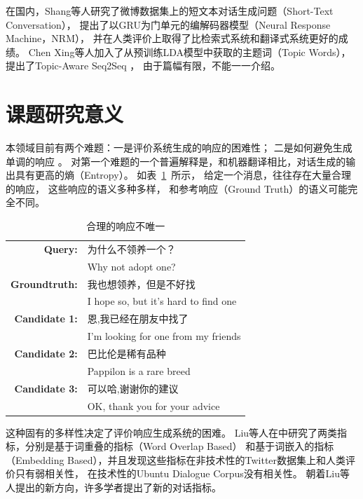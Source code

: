 在国内，Shang等人研究了微博数据集上的短文本对话生成问题（Short-Text Conversation），
提出了以GRU为门单元的编解码器模型（Neural Response Machine，NRM），
并在人类评价上取得了比检索式系统和翻译式系统更好的成绩。
Chen Xing等人加入了从预训练LDA模型中获取的主题词（Topic Words），提出了Topic-Aware Seq2Seq ，
由于篇幅有限，不能一一介绍。


\section{课题研究意义}\label{sec:research_meaning}
本领域目前有两个难题：一是评价系统生成的响应的困难性；
二是如何避免生成单调的响应
。
对第一个难题的一个普遍解释是，和机器翻译相比，对话生成的输出具有更高的熵（Entropy）。
如表~\ref{tab:multiple_valid_responses}~所示，
给定一个消息，往往存在大量合理的响应，
这些响应的语义多种多样，
和参考响应（Ground Truth）的语义可能完全不同。

\begin{table}[H]
    \centering
    \caption{合理的响应不唯一}
    \label{tab:multiple_valid_responses}
    \begin{tabular}{rl}
        \toprule
        \textbf{Query:} & 为什么不领养一个？ \\
        & Why not adopt one? \\
        \textbf{Groundtruth:} & 我也想领养，但是不好找 \\
        & I hope so, but it's hard to find one \\
        \midrule
        \textbf{Candidate 1:} & 恩,我已经在朋友中找了 \\
        & I'm looking for one from my friends \\
        \textbf{Candidate 2:} & 巴比伦是稀有品种 \\
        & Pappilon is a rare breed \\
        \textbf{Candidate 3:} & 可以哈,谢谢你的建议 \\
        & OK, thank you for your advice \\
        \bottomrule
    \end{tabular}
\end{table}

这种固有的多样性决定了评价响应生成系统的困难。
Liu等人在\cite{HowNot}中研究了两类指标，分别是基于词重叠的指标（Word Overlap Based）
和基于词嵌入的指标（Embedding Based），并且发现这些指标在非技术性的Twitter数据集上和人类评价只有弱相关性，
在技术性的Ubuntu Dialogue Corpus没有相关性。
朝着Liu等人提出的新方向，许多学者提出了新的对话指标。

